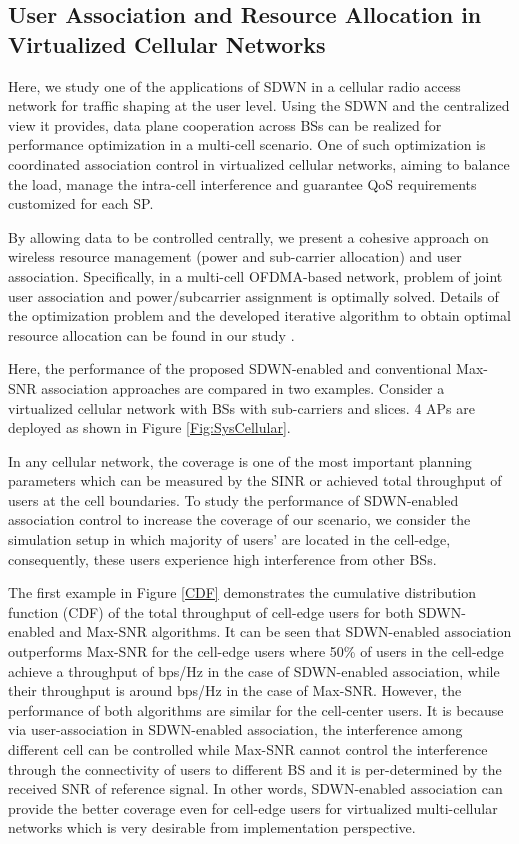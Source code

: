 \documentclass[conference]{IEEEtran}
\begin{document}
\subsection{User Association and Resource Allocation in Virtualized Cellular Networks}
Here, we study one of the applications of SDWN in a cellular radio access network for traffic shaping at the user level. Using the SDWN and the centralized view it provides, data plane cooperation across BSs can be realized for performance optimization in a multi-cell scenario. One of such optimization is coordinated association control in virtualized cellular networks, aiming to balance the load, manage the intra-cell interference and guarantee QoS requirements customized for each SP. 

By allowing data to be controlled centrally, we present a cohesive approach on wireless resource management (power and sub-carrier allocation) and user association. Specifically, in a multi-cell OFDMA-based network, problem of joint user association and power/subcarrier assignment is optimally solved. Details of the optimization problem and the developed iterative algorithm to obtain optimal resource allocation can be found in our study \cite{Parsaeefard2015}.


Here, the performance of the proposed SDWN-enabled and conventional Max-SNR association approaches are compared in two examples. Consider a virtualized cellular network with  BSs with  sub-carriers and  slices. 4 APs are deployed as shown in Figure \ref{Fig:SysCellular}. 

In any cellular network, the coverage is one of the most important planning parameters which can be measured by the SINR or achieved total throughput of users at the cell boundaries. To study the performance of SDWN-enabled association control to increase the coverage of our scenario, we consider the simulation setup in which majority of users’ are located in the cell-edge, consequently, these users experience high interference from other BSs.

The first example in Figure \ref{CDF} demonstrates the cumulative distribution function (CDF) of the total throughput of cell-edge users for both SDWN-enabled and Max-SNR algorithms. It can be seen that SDWN-enabled association outperforms Max-SNR for the cell-edge users where 50\% of users in the cell-edge achieve a throughput of  bps/Hz in the case of SDWN-enabled association, while their throughput is around  bps/Hz in the case of Max-SNR. However, the performance of both algorithms are similar for the cell-center users. It is because via user-association in SDWN-enabled association, the interference among different cell can be controlled while Max-SNR cannot control the interference through the connectivity of users to different BS and it is per-determined by the received SNR of reference signal. In other words, SDWN-enabled association can provide the better coverage even for cell-edge users for virtualized multi-cellular networks which is very desirable from implementation perspective.
\end{document}
